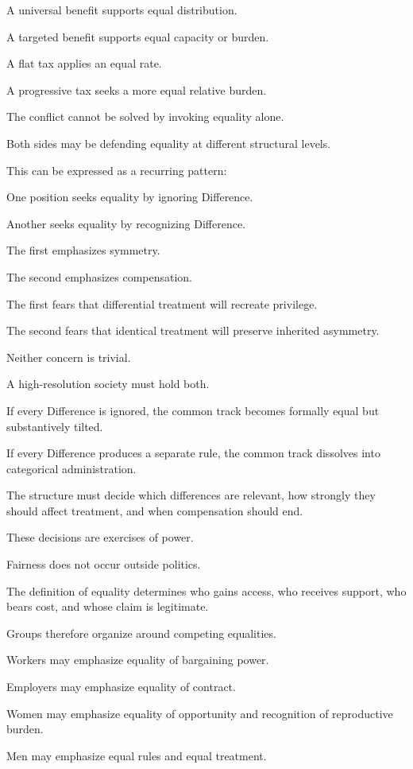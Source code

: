 A universal benefit supports equal distribution.

A targeted benefit supports equal capacity or burden.

A flat tax applies an equal rate.

A progressive tax seeks a more equal relative burden.

The conflict cannot be solved by invoking equality alone.

Both sides may be defending equality at different structural levels.

This can be expressed as a recurring pattern:

One position seeks equality by ignoring Difference.

Another seeks equality by recognizing Difference.

The first emphasizes symmetry.

The second emphasizes compensation.

The first fears that differential treatment will recreate privilege.

The second fears that identical treatment will preserve inherited asymmetry.

Neither concern is trivial.

A high-resolution society must hold both.

If every Difference is ignored, the common track becomes formally equal but substantively tilted.

If every Difference produces a separate rule, the common track dissolves into categorical administration.

The structure must decide which differences are relevant, how strongly they should affect treatment, and when compensation should end.

These decisions are exercises of power.

Fairness does not occur outside politics.

The definition of equality determines who gains access, who receives support, who bears cost, and whose claim is legitimate.

Groups therefore organize around competing equalities.

Workers may emphasize equality of bargaining power.

Employers may emphasize equality of contract.

Women may emphasize equality of opportunity and recognition of reproductive burden.

Men may emphasize equal rules and equal treatment.

